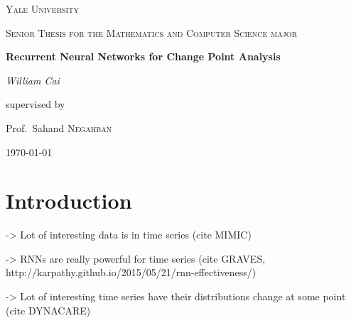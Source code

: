 \documentclass[12pt,a4paper]{article}
\begin{document}
\begin{titlepage}
	\centering
	{\scshape\LARGE Yale University \par}
	\vspace{1cm}
	{\scshape\Large Senior Thesis for the Mathematics and Computer Science major\par}
	\vspace{1.5cm}
	{\huge\bfseries Recurrent Neural Networks for Change Point Analysis\par}
	\vspace{2cm}
	{\Large\itshape William Cai\par}
	\vfill
	supervised by\par
	Prof.~Sahand \textsc{Negahban}

	\vfill

	{\large \today\par}
\end{titlepage}
\begin{abstract}
In this paper we present a synthetic time-series dataset which is motivated by vital measurements for patients in the ICU (MIMIC).  At time zero, the time series moves according to one probability distribution.  We then have some criterion (motivated by events such as cardiac arrest), which a fraction of the generated examples trigger, causing the probability distribution to change for the remainder of the time series.  We then try to solve the problems of regression, predicting what the next measurement will be, and classification, predicting which generation function is currently generating the data, on this dataset.  The models we consider include a random forest, single-layer perceptron, deep neural network, and a recurrent neural network.  We give a comparison of the capability of these models to do this kind of change point analysis, and also consider their robustness in the face of missing data.  
\end{abstract}

\section{Introduction}

-> Lot of interesting data is in time series (cite MIMIC)

-> RNNs are really powerful for time series (cite GRAVES, http://karpathy.github.io/2015/05/21/rnn-effectiveness/)

-> Lot of interesting time series have their distributions change at some point (cite DYNACARE)
\end{document}
